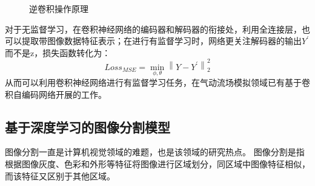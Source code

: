 \begin{figure}[htb]
	\centering
	 \qquad
	\caption{逆卷积操作原理}
	\label{fig:conv_dconv}
\end{figure}



对于无监督学习，在卷积神经网络的编码器和解码器的衔接处，利用全连接层，也可以提取带图像数据特征表示；在进行有监督学习时，网络更关注解码器的输出$Y^{\prime}$而不是z，损失函数转化为：
\begin{equation}
Loss_{MSE} = \min _{\phi, \theta}\left\|Y-Y^{\prime}\right\|_{2}^{2}
\end{equation}
从而可以利用卷积神经网络进行有监督学习任务，在气动流场模拟领域已有基于卷积自编码网络开展的工作\cite{DBLP:conf/kdd/GuoLI16}。



\subsection{基于深度学习的图像分割模型}
图像分割一直是计算机视觉领域的难题，也是该领域的研究热点。
图像分割是指根据图像灰度、色彩和外形等特征将图像进行区域划分，同区域中图像特征相似，而该特征又区别于其他区域\cite{图像分割方法综述}。

